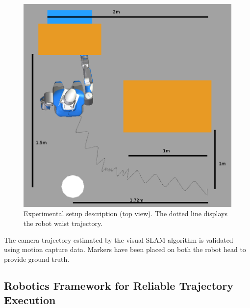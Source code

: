 \begin{figure}[ht!]
  \begin{center}
    \includegraphics[width=\linewidth]{images/dimensions.png}
  \end{center}
  \caption{Experimental setup description (top view). The dotted line
    displays the robot waist trajectory.\label{fig:xp_setup_dim}}
\end{figure}


The camera trajectory estimated by the visual SLAM algorithm is
validated using motion capture data. Markers have been placed on both
the robot head to provide ground truth.


\subsection{Robotics Framework for Reliable Trajectory Execution}\label{sec:ex_framework}

